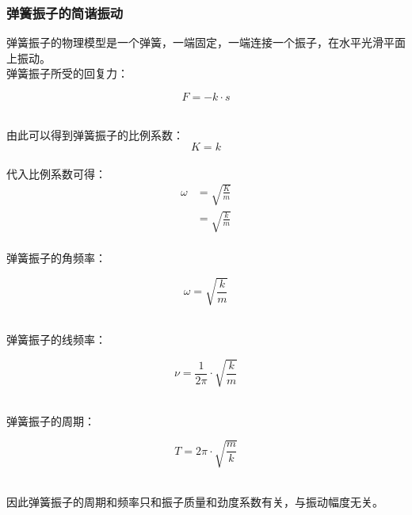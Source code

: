 \documentclass[UTF8]{ctexart}
\begin{document}
\subsubsection{弹簧振子的简谐振动}
    弹簧振子的物理模型是一个弹簧，一端固定，一端连接一个振子，在水平光滑平面上振动。\\[3mm]
    弹簧振子所受的回复力：
    \setcounter{equation}{0}
    \begin{large}
        \begin{equation*}
            F=-k\cdot s
        \end{equation*}
    \end{large}\\
    由此可以得到弹簧振子的比例系数：
    \begin{equation}
        K=k
    \end{equation}\\
    代入比例系数可得：
    \begin{align}
        \omega
        &=\sqrt{\frac{K}{m}}\\[3mm]
        &=\sqrt{\frac{k}{m}}
    \end{align}\\
    弹簧振子的角频率：
    \begin{large}
        \begin{equation*}
            \omega=\sqrt{\frac{k}{m}}
        \end{equation*}
    \end{large}\\
    弹簧振子的线频率：
    \begin{large}
        \begin{equation*}
            \nu=\frac{1}{2\pi}\cdot\sqrt{\frac{k}{m}}
        \end{equation*}
    \end{large}\\
    弹簧振子的周期：
    \begin{large}
        \begin{equation*}
            T=2\pi\cdot\sqrt{\frac{m}{k}}
        \end{equation*}
    \end{large}\\
    因此弹簧振子的周期和频率只和振子质量和劲度系数有关，与振动幅度无关。

\newpage
\end{document}
